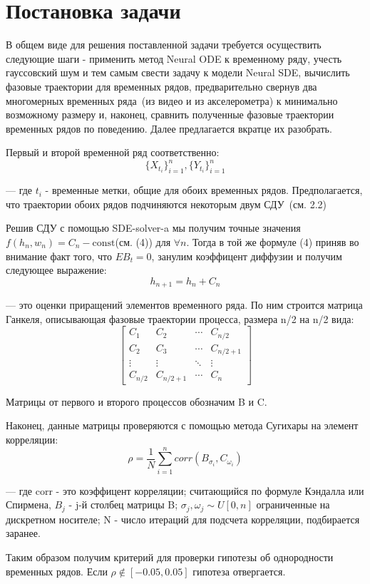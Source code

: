 \documentclass{article}
\begin{document}
\section{Постановка задачи}
   
   \par В общем виде для решения поставленной задачи требуется осуществить следующие шаги - применить метод Neural ODE к временному ряду, учесть гауссовский шум и тем самым свести задачу к модели Neural SDE, вычислить фазовые траектории для временных рядов, предварительно свернув два многомерных временных ряда~(из видео и из акселерометра) к минимально возможному размеру и, наконец, сравнить полученные фазовые траектории временных рядов по поведению. Далее предлагается вкратце их разобрать.
   \par Первый и второй временной ряд соответственно: \begin{equation}\{X_{t_i}\}_{i=1}^n,\{Y_{t_i}\}_{i=1}^n \end{equation} \par --- где $t_i$ - временные метки, общие для обоих временных рядов. Предполагается, что траектории обоих рядов подчиняются некоторым двум СДУ~(см. 2.2)
   \par Решив СДУ с помощью SDE-solver-a мы получим точные значения $f(h_n,w_n)= C_n-\text{const}$(см. (4)) для $\forall n$. Тогда в той же формуле (4) приняв во внимание факт того, что $E B_t=0$, занулим коэффицент диффузии и получим следующее выражение:
   \begin{equation} h_{n+1} = h_n + C_n    \end{equation}
   \par --- это оценки приращений элементов временного ряда. По ним строится матрица Ганкеля, описывающая фазовые траектории процесса, размера n/2 на n/2 вида:
    \begin{equation}
 \begin{bmatrix}
   C_1 & C_2 & \cdots & C_{n/2} \\
   C_2 & C_3 & \cdots & C_{n/2+1} \\
   \vdots  & \vdots  & \ddots & \vdots  \\
   C_{n/2} & C_{n/2+1} & \cdots & C_{n} 
 \end{bmatrix}
\end{equation}
   \par Матрицы от первого и второго процессов обозначим B и C.
   \par Наконец, данные матрицы проверяются с помощью метода Сугихары на элемент корреляции: 
   \begin{equation}  \rho = \frac{1}{N} \sum_{i=1}^n corr(B_{\sigma_i}, C_{\omega_i})  \end{equation}
   \par --- где corr - это коэффицент корреляции; считающийся по формуле Кэндалла или Спирмена, $B_j$ - j-й столбец матрицы B; $\sigma_j, \omega_j \sim U[0,n] $ ограниченные на дискретном носителе; N - число итераций для подсчета корреляции, подбирается заранее.
   \par Таким образом получим критерий для проверки гипотезы об однородности временных рядов. Если $\rho \notin [-0.05,0.05]$ гипотеза отвергается.
\end{document}
